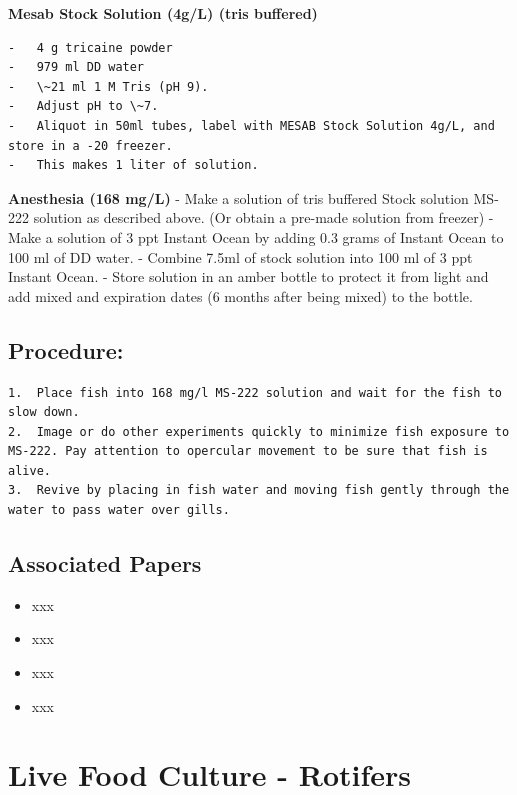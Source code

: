 \documentclass[
  letterpaper,
  DIV=11,
  numbers=noendperiod]{scrreprt}
\providecommand{\tightlist}{%
  \setlength{\itemsep}{0pt}\setlength{\parskip}{0pt}}\usepackage{longtable,booktabs,array}
\begin{document}
\textbf{Mesab Stock Solution (4g/L) (tris buffered)}

\begin{verbatim}
-   4 g tricaine powder
-   979 ml DD water
-   \~21 ml 1 M Tris (pH 9).
-   Adjust pH to \~7.
-   Aliquot in 50ml tubes, label with MESAB Stock Solution 4g/L, and store in a -20 freezer.
-   This makes 1 liter of solution.
\end{verbatim}

\textbf{Anesthesia (168 mg/L)} - Make a solution of tris buffered Stock
solution MS-222 solution as described above. (Or obtain a pre-made
solution from freezer) - Make a solution of 3 ppt Instant Ocean by
adding 0.3 grams of Instant Ocean to 100 ml of DD water. - Combine 7.5ml
of stock solution into 100 ml of 3 ppt Instant Ocean. - Store solution
in an amber bottle to protect it from light and add mixed and expiration
dates (6 months after being mixed) to the bottle.

\hypertarget{procedure-44}{%
\section{Procedure:}\label{procedure-44}}

\begin{verbatim}
1.  Place fish into 168 mg/l MS-222 solution and wait for the fish to slow down.
2.  Image or do other experiments quickly to minimize fish exposure to MS-222. Pay attention to opercular movement to be sure that fish is alive.
3.  Revive by placing in fish water and moving fish gently through the water to pass water over gills.
\end{verbatim}

\hypertarget{associated-papers-30}{%
\section{Associated Papers}\label{associated-papers-30}}

\begin{itemize}
\tightlist
\item
  xxx
\item
  xxx
\item
  xxx
\item
  xxx
\end{itemize}

\hypertarget{sec-husbandry-rotifer}{%
\chapter{Live Food Culture - Rotifers}\label{sec-husbandry-rotifer}}
\end{document}
